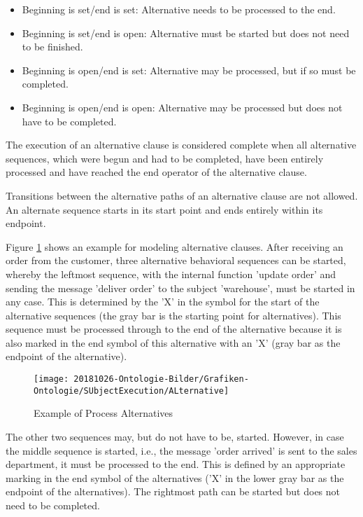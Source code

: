 \begin{itemize}
	\item Beginning is set/end is set: Alternative needs to be processed to the end.
	\item Beginning is set/end is open: Alternative must be started but does not need to be finished. 
	\item Beginning is open/end is set: Alternative may be processed, but if so must be completed.
	\item Beginning is open/end is open: Alternative may be processed but does not have to be completed.
\end{itemize}

The execution of an alternative clause is considered complete when all alternative sequences, which were begun and had to be completed, have been entirely processed and have reached the end operator of the alternative clause.

Transitions between the alternative paths of an alternative clause are not allowed. An alternate sequence starts in its start point and ends entirely within its endpoint.

Figure \ref{fig:alternative} shows an example for modeling alternative clauses. After receiving an order from the customer, three alternative behavioral sequences can be started, whereby the leftmost sequence, with the internal function 'update order' and sending the message 'deliver order' to the subject 'warehouse', must be started in any case. This is determined by the 'X' in the symbol for the start of the alternative sequences (the gray bar is the starting point for alternatives). This sequence must be processed through to the end of the alternative because it is also marked in the end symbol of this alternative with an 'X' (gray bar as the endpoint of the alternative).

\begin{figure}[htbp]
	\centering
	\texttt{[image: 20181026-Ontologie-Bilder/Grafiken-Ontologie/SUbjectExecution/ALternative]}
	\caption[Example of Process Alternatives]{Example of Process Alternatives}
	\label{fig:alternative}
\end{figure}

The other two sequences may, but do not have to be, started. However, in case the middle sequence is started, i.e., the message 'order arrived' is sent to the sales department, it must be processed to the end. This is defined by an appropriate marking in the end symbol of the alternatives ('X' in the lower gray bar as the endpoint of the alternatives). The rightmost path can be started but does not need to be completed.

